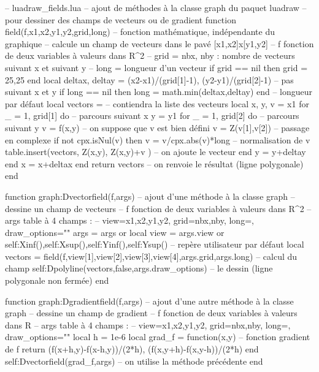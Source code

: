 \begin{Luacode}
-- luadraw_fields.lua
-- ajout de méthodes à la classe graph du paquet luadraw
-- pour dessiner des champs de vecteurs ou de gradient
function field(f,x1,x2,y1,y2,grid,long)  -- fonction mathématique, indépendante du graphique
-- calcule un champ de vecteurs dans le pavé [x1,x2]x[y1,y2]
-- f fonction de deux variables à valeurs dans R^2
-- grid = {nbx, nby} : nombre de vecteurs suivant x et suivant y
-- long = longueur d'un vecteur
    if grid == nil then grid = {25,25} end
    local deltax, deltay = (x2-x1)/(grid[1]-1), (y2-y1)/(grid[2]-1) -- pas suivant x et y
    if long == nil then long = math.min(deltax,deltay) end -- longueur par défaut
    local vectors = {} -- contiendra la liste des vecteurs
    local x, y, v = x1 
    for _ = 1, grid[1] do -- parcours suivant x
        y = y1
        for _ = 1, grid[2] do -- parcours suivant y
            v = f(x,y) -- on suppose que v est bien défini
            v = Z(v[1],v[2]) -- passage en complexe
            if not cpx.isNul(v) then
                v = v/cpx.abs(v)*long -- normalisation de v
                table.insert(vectors, {Z(x,y), Z(x,y)+v} ) -- on ajoute le vecteur
            end
            y = y+deltay
        end
        x = x+deltax
    end
    return vectors -- on renvoie le résultat (ligne polygonale)
end

function graph:Dvectorfield(f,args) -- ajout d'une méthode à la classe graph
-- dessine un champ de vecteurs
-- f fonction de deux variables à valeurs dans R^2
-- args table à 4 champs :
-- { view={x1,x2,y1,y2}, grid={nbx,nby}, long=, draw_options=""}
    args = args or {}
    local view = args.view or {self:Xinf(),self:Xsup(),self:Yinf(),self:Ysup()} -- repère utilisateur par défaut
    local vectors = field(f,view[1],view[2],view[3],view[4],args.grid,args.long) -- calcul du champ
    self:Dpolyline(vectors,false,args.draw_options) -- le dessin (ligne polygonale non fermée)
end

function graph:Dgradientfield(f,args) -- ajout d'une autre méthode à la classe graph
-- dessine un champ de gradient
-- f fonction de deux variables à valeurs dans R
-- args table à 4 champs :
-- { view={x1,x2,y1,y2}, grid={nbx,nby}, long=, draw_options=""}
    local h = 1e-6
    local grad_f = function(x,y) -- fonction gradient de f
        return { (f(x+h,y)-f(x-h,y))/(2*h), (f(x,y+h)-f(x,y-h))/(2*h) }
    end
    self:Dvectorfield(grad_f,args) -- on utilise la méthode précédente
end
\end{Luacode}

